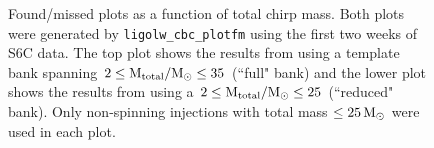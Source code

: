 \begin{figure}[p]
\center
{}
\label{fig:smaller_bank_investigation-lowmass}
\caption{Found/missed plots as a function of total chirp mass. Both plots were
generated by \texttt{ligolw\_cbc\_plotfm} using the first two weeks of S6C
data. The top plot shows the results from using a template bank spanning $2
\leq \mathrm{M_{total}}/\mathrm{M_\odot} \leq 35$ (``full" bank) and the lower plot shows the results
from using a $2 \leq \mathrm{M_{total}}/\mathrm{M_\odot} \leq 25$ (``reduced" bank). Only
non-spinning injections with total mass $\leq 25\,\mathrm{M_\odot}$ were used in each
plot.}
\end{figure}

